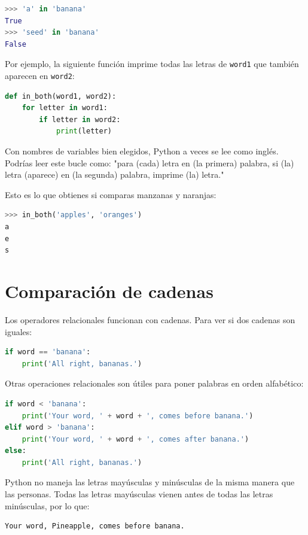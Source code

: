 \begin{lstlisting}[language=Python]
>>> 'a' in 'banana'
True
>>> 'seed' in 'banana'
False
\end{lstlisting}

Por ejemplo, la siguiente función imprime todas las letras de \texttt{word1} que también aparecen en \texttt{word2}:

\begin{lstlisting}[language=Python]
def in_both(word1, word2):
    for letter in word1:
        if letter in word2:
            print(letter)
\end{lstlisting}

Con nombres de variables bien elegidos, Python a veces se lee como inglés. Podrías leer este bucle como: "para (cada) letra en (la primera) palabra, si (la) letra (aparece) en (la segunda) palabra, imprime (la) letra."

Esto es lo que obtienes si comparas manzanas y naranjas:

\begin{lstlisting}[language=Python]
>>> in_both('apples', 'oranges')
a
e
s
\end{lstlisting}

\section{Comparación de cadenas}

Los operadores relacionales funcionan con cadenas. Para ver si dos cadenas son iguales:

\begin{lstlisting}[language=Python]
if word == 'banana':
    print('All right, bananas.')
\end{lstlisting}

Otras operaciones relacionales son útiles para poner palabras en orden alfabético:

\begin{lstlisting}[language=Python]
if word < 'banana':
    print('Your word, ' + word + ', comes before banana.')
elif word > 'banana':
    print('Your word, ' + word + ', comes after banana.')
else:
    print('All right, bananas.')
\end{lstlisting}

Python no maneja las letras mayúsculas y minúsculas de la misma manera que las personas. Todas las letras mayúsculas vienen antes de todas las letras minúsculas, por lo que:

\begin{lstlisting}[language=Python]
Your word, Pineapple, comes before banana.
\end{lstlisting}

